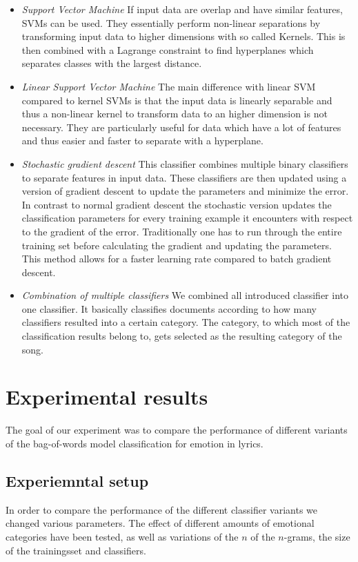 \documentclass[a4paper,12pt]{article}
\begin{document}
\begin{itemize}
\item \textit{Support Vector Machine}
If input data are overlap and have similar features, SVMs can be used. They essentially perform non-linear separations by transforming input data to higher dimensions with so called Kernels. This is then combined with a Lagrange constraint to find hyperplanes which separates classes with the largest distance. 


\item \textit{Linear Support Vector Machine}
The main difference with linear SVM compared to kernel SVMs is that the  input data is linearly separable and thus a non-linear kernel to transform data to an higher dimension is not necessary. They are particularly useful for data which have a lot of features and thus easier and faster to separate with a hyperplane.

\item \textit{Stochastic gradient descent}
This classifier combines multiple binary classifiers to separate features in input data. These classifiers are then updated using a version of gradient descent to update the parameters and minimize the error. In contrast to normal gradient descent the stochastic version updates the classification parameters for every training example it encounters with respect to the gradient of the error. Traditionally one has to run through the entire training set before calculating the gradient and updating the parameters. This method allows for a faster learning rate compared to batch gradient descent.

\item \textit{Combination of multiple classifiers} We combined all introduced classifier into one classifier. It basically classifies documents according to how many classifiers resulted into a certain category. The category, to which most of the classification results belong to, gets selected as the resulting category of the song.
\end{itemize}

\section{Experimental results}
\label{sec:exps}
The goal of our experiment was to compare the performance of different variants of the bag-of-words model classification for emotion in lyrics. 
 

\subsection{Experiemntal setup}
In order to compare the performance of the different classifier variants we changed various parameters. The effect of different amounts of emotional categories have been tested, as well as variations of the $n$ of the $n$-grams, the size of the trainingsset and classifiers.
\end{document}
